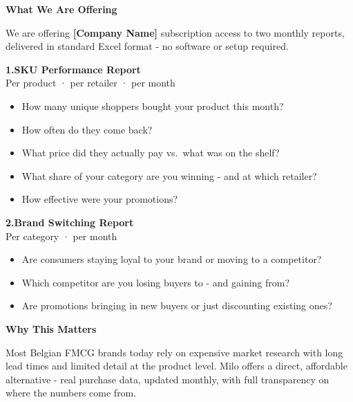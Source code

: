 \documentclass[11pt,a4paper]{article}
\begin{document}
\vspace{10pt}
{\large\textbf{\textcolor{milonavy}{What We Are Offering}}}
\vspace{2pt}

We are offering \textbf{[Company Name]} subscription access to two monthly reports, delivered in standard Excel format - no software or setup required.

\vspace{6pt}
\textbf{1.\enspace SKU Performance Report}\\
{\small\textcolor{milogray}{Per product · per retailer · per month}}

\vspace{3pt}
\begin{itemize}[leftmargin=1.6em, itemsep=1pt, topsep=2pt]
  \item How many unique shoppers bought your product this month?
  \item How often do they come back?
  \item What price did they actually pay vs.\ what was on the shelf?
  \item What share of your category are you winning - and at which retailer?
  \item How effective were your promotions?
\end{itemize}

\vspace{8pt}
\textbf{2.\enspace Brand Switching Report}\\
{\small\textcolor{milogray}{Per category · per month}}

\vspace{3pt}
\begin{itemize}[leftmargin=1.6em, itemsep=1pt, topsep=2pt]
  \item Are consumers staying loyal to your brand or moving to a competitor?
  \item Which competitor are you losing buyers to - and gaining from?
  \item Are promotions bringing in new buyers or just discounting existing ones?
\end{itemize}

\vspace{10pt}
{\large\textbf{\textcolor{milonavy}{Why This Matters}}}
\vspace{2pt}

Most Belgian FMCG brands today rely on expensive market research with long lead times and limited detail at the product level. Milo offers a direct, affordable alternative - real purchase data, updated monthly, with full transparency on where the numbers come from.
\end{document}
